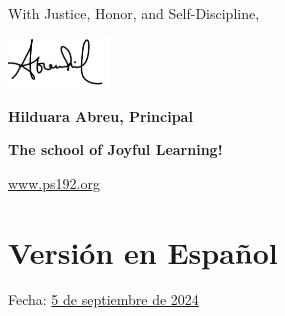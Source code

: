\documentclass[letterpaper, 12pt]{article}
\begin{document}
With Justice, Honor, and Self-Discipline,

\includegraphics[width=0.2\textwidth]{hil_signature}

\textbf{Hilduara Abreu, Principal}

\textbf{The school of Joyful Learning!}

\href{www.ps192.org}{www.ps192.org}

\pagebreak
\vspace*{-1cm}

\section*{Versión en Español}
\label{sec:org4d63e0c}
Fecha: \href{https://www.ps192.org}{5 de septiembre de 2024}
\end{document}

